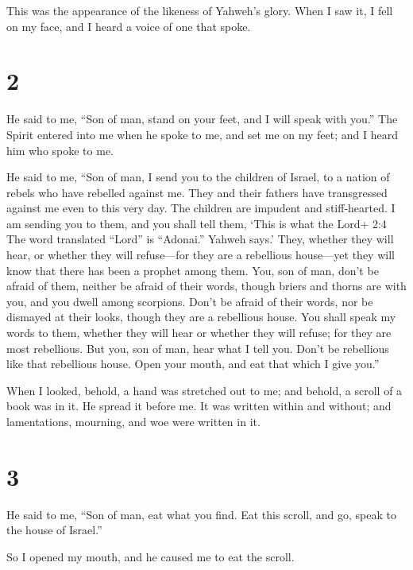 This was the appearance of the likeness of Yahweh's glory. When I saw
it, I fell on my face, and I heard a voice of one that spoke.

\hypertarget{section-1}{%
\section{2}\label{section-1}}

 He said to me, ``Son of man, stand on your feet, and I will
speak with you.''  The Spirit entered into me when he spoke
to me, and set me on my feet; and I heard him who spoke to me.

 He said to me, ``Son of man, I send you to the children of
Israel, to a nation of rebels who have rebelled against me. They and
their fathers have transgressed against me even to this very day.
 The children are impudent and stiff-hearted. I am sending
you to them, and you shall tell them, `This is what the Lord+ 2:4 The
word translated ``Lord'' is ``Adonai.'' Yahweh says.'  They,
whether they will hear, or whether they will refuse---for they are a
rebellious house---yet they will know that there has been a prophet
among them.  You, son of man, don't be afraid of them,
neither be afraid of their words, though briers and thorns are with you,
and you dwell among scorpions. Don't be afraid of their words, nor be
dismayed at their looks, though they are a rebellious house.
 You shall speak my words to them, whether they will hear or
whether they will refuse; for they are most rebellious.  But
you, son of man, hear what I tell you. Don't be rebellious like that
rebellious house. Open your mouth, and eat that which I give you.''

 When I looked, behold, a hand was stretched out to me; and
behold, a scroll of a book was in it.  He spread it before
me. It was written within and without; and lamentations, mourning, and
woe were written in it.

\hypertarget{section-2}{%
\section{3}\label{section-2}}

 He said to me, ``Son of man, eat what you find. Eat this
scroll, and go, speak to the house of Israel.''

 So I opened my mouth, and he caused me to eat the scroll.

